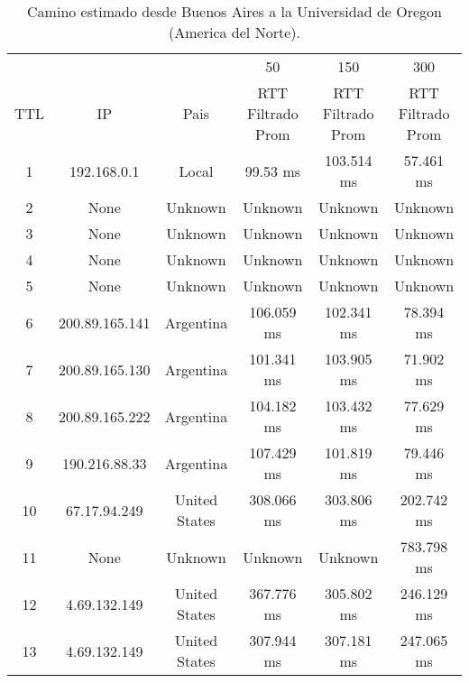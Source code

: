 \begin{table}[H]
\centering
\caption{Camino estimado desde Buenos Aires a la Universidad de Oregon (America del Norte).}
\begin{tabular}{ | c | c | c | c | c | c | }
	\hline 
  & & & 50	& 150	& 300 \\ %
TTL	&          IP         	     &    Pais        & 	 RTT Filtrado Prom  	&  RTT Filtrado Prom  & 	 RTT Filtrado Prom  \\ \hline  
1	& 192.168.0.1       &   	       Local      &   	       99.53 ms    &  	     103.514 ms   &   	      57.461 ms   \\ \hline    
2	& None               &  	      Unknown     &   	      Unknown      &  	      Unknown     &   	      Unknown     \\ \hline    
3	& None               &  	      Unknown     &   	      Unknown      &  	      Unknown     &   	      Unknown     \\ \hline    
4	& None               &  	      Unknown     &   	      Unknown      &  	      Unknown     &   	      Unknown     \\ \hline    
5	& None               &  	      Unknown     &   	      Unknown      &  	      Unknown     &   	      Unknown     \\ \hline    
6	& 200.89.165.141    &   	     Argentina    &   	     106.059 ms    &  	     102.341 ms   &   	      78.394 ms   \\ \hline    
7	& 200.89.165.130    &   	     Argentina    &   	     101.341 ms    &  	     103.905 ms   &   	      71.902 ms   \\ \hline    
8	& 200.89.165.222    &   	     Argentina    &   	     104.182 ms    &  	     103.432 ms   &   	      77.629 ms   \\ \hline    
9	& 190.216.88.33     &   	     Argentina    &   	     107.429 ms    &  	     101.819 ms   &   	      79.446 ms   \\ \hline    
10	& 67.17.94.249     &    	   United States  &   	     308.066 ms    &  	     303.806 ms   &   	     202.742 ms   \\ \hline    
11	& None               &  	      Unknown     &   	      Unknown      &  	      Unknown     &   	     783.798 ms   \\ \hline    
12	& 4.69.132.149    &     	   United States  &   	     367.776 ms    &  	     305.802 ms   &   	     246.129 ms   \\ \hline    
13	& 4.69.132.149    &     	   United States  &   	     307.944 ms    &  	     307.181 ms   &   	     247.065 ms   \\ \hline    

\end{tabular}
\end{table}
